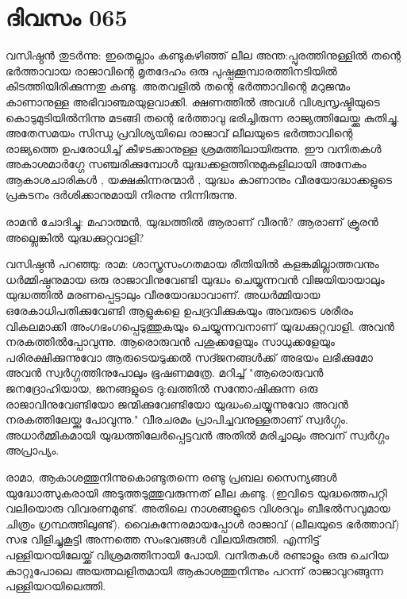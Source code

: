 \newpage
\section{ദിവസം 065}


വസിഷ്ഠന്‍ തുടര്‍ന്നു: ഇതെല്ലാം കണ്ടുകഴിഞ്ഞ്‌ ലീല അന്ത:പ്പുരത്തിനുള്ളില്‍ തന്റെ ഭര്‍ത്താവായ രാജാവിന്റെ മൃതദേഹം ഒരു പുഷ്പക്കൂമ്പാരത്തിനടിയില്‍ കിടത്തിയിരിക്കുന്നതു കണ്ടു. അതവളില്‍ തന്റെ ഭര്‍ത്താവിന്റെ മറുജന്മം കാണാനുള്ള അഭിവാഞ്ഛയുളവാക്കി. ക്ഷണത്തില്‍ അവള്‍ വിശ്വസൃഷ്ടിയുടെ കൊടുമുടിയില്‍നിന്നു മടങ്ങി തന്റെ ഭര്‍ത്താവു ഭരിച്ചിരുന്ന രാജ്യത്തിലേയ്ക്കു കുതിച്ചു. അതേസമയം സിന്ധു പ്രവിശ്യയിലെ രാജാവ്‌ ലീലയുടെ ഭര്‍ത്താവിന്റെ രാജ്യത്തെ ഉപരോധിച്ച്‌ കീഴടക്കാനുള്ള ശ്രമത്തിലായിരുന്നു. ഈ വനിതകള്‍ അകാശമാര്‍ഗ്ഗേ സഞ്ചരിക്കുമ്പോള്‍ യുദ്ധക്കളത്തിനുമുകളിലായി അനേകം ആകാശചാരികള്‍ , യക്ഷകിന്നരന്മാര്‍ , യുദ്ധം കാണാനും വീരയോദ്ധാക്കളുടെ പ്രകടനം ദര്‍ശിക്കാനുമായി നിരന്നു നിന്നിരുന്നു.

രാമന്‍ ചോദിച്ചു: മഹാത്മന്‍, യുദ്ധത്തില്‍ ആരാണ്‌ വീരന്‍? ആരാണ്‌ ക്രൂരന്‍ അല്ലെങ്കില്‍ യുദ്ധക്കുറ്റവാളി?

വസിഷ്ഠന്‍ പറഞ്ഞു: രാമ: ശാസ്ത്രസംഗതമായ രീതിയില്‍ കളങ്കമില്ലാത്തവനും ധര്‍മ്മിഷ്ഠനുമായ ഒരു രാജാവിനുവേണ്ടി യുദ്ധം ചെയ്യുന്നവന്‍ വിജയിയായാലും യുദ്ധത്തില്‍ മരണപ്പെട്ടാലും വീരയോദ്ധാവാണ്‌. അധര്‍മ്മിയായ ഒരേകാധിപതിക്കുവേണ്ടി ആളുകളെ ഉപദ്രവിക്കുകയും അവരുടെ ശരീരം വികലമാക്കി അംഗഭംഗപ്പെടുത്തുകയും ചെയ്യുന്നവനാണ്‌ യുദ്ധക്കുറ്റവാളി. അവന്‍ നരകത്തില്‍പ്പോവുന്നു. ആരൊരുവന്‍ പശുക്കളേയും സാധുക്കളേയും പരിരക്ഷിക്കുന്നുവോ ആരുടെയടുക്കല്‍ സദ്ജനങ്ങള്‍ക്ക്‌ അഭയം ലഭിക്കുമോ അവന്‍ സ്വര്‍ഗ്ഗത്തിനുപോലും ഭൂഷണമത്രേ. മറിച്ച്‌ "ആരൊരുവന്‍ ജനദ്രോഹിയായ, ജനങ്ങളുടെ ദു:ഖത്തില്‍ സന്തോഷിക്കുന്ന ഒരു രാജാവിനുവേണ്ടിയോ ജന്മിക്കുവേണ്ടിയോ യുദ്ധംചെയ്യുന്നുവോ അവന്‍ നരകത്തിലേയ്ക്കു പോവുന്നു." വീരചരമം പ്രാപിച്ചവനുള്ളതാണ്‌ സ്വര്‍ഗ്ഗം. അധാര്‍മ്മികമായി യുദ്ധത്തിലേര്‍പ്പെട്ടവന്‍ അതില്‍ മരിച്ചാലും അവന്‌ സ്വര്‍ഗ്ഗം അപ്രാപ്യം.

രാമാ, ആകാശത്തുനിന്നുകൊണ്ടുതന്നെ രണ്ടു പ്രബല സൈന്യങ്ങള്‍ യുദ്ധോത്സുകരായി അടുത്തടുത്തുവരുന്നത്‌ ലീല കണ്ടു. (ഇവിടെ യുദ്ധത്തെപറ്റി വലിയൊരു വിവരണമുണ്ട്‌. അതിലെ നാശങ്ങളുടെ വിശദവും ബീഭല്‍സവുമായ ചിത്രം ഗ്രന്ഥത്തിലുണ്ട്‌). വൈകുന്നേരമായപ്പോള്‍  രാജാവ്‌ (ലീലയുടെ ഭർത്താവ്) സഭ വിളിച്ചുകൂട്ടി അന്നത്തെ സംഭവങ്ങള്‍ വിലയിരുത്തി. എന്നിട്ട്‌ പള്ളിയറയിലേയ്ക്ക്‌ വിശ്രമത്തിനായി പോയി. വനിതകള്‍ രണ്ടാളും ഒരു ചെറിയ കാറ്റുപോലെ അയത്നലളിതമായി ആകാശത്തുനിന്നും പറന്ന് രാജാവുറങ്ങുന്ന പള്ളിയറയിലെത്തി.
